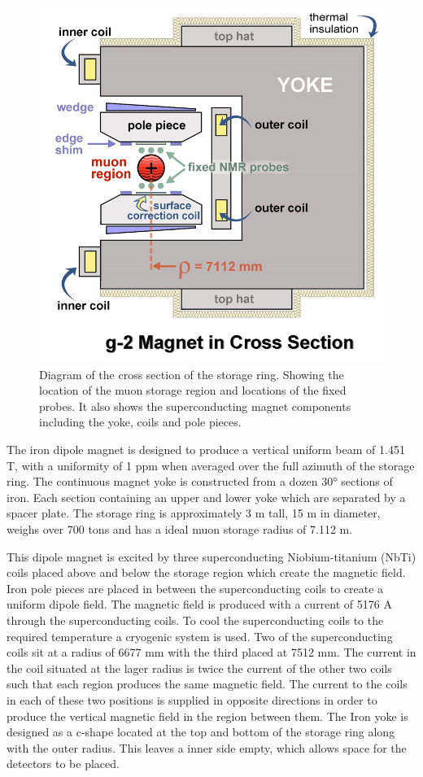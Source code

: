\begin{figure}[th]
\centering
\includegraphics[scale=0.8]{Figures/storageringmagnet}
\decoRule
\caption{Diagram of the cross section of the storage ring. 
Showing the location of the muon storage region and locations of the fixed probes. It also shows the superconducting magnet components including the yoke, coils and pole pieces.}
\label{fig:storageringmagnet}
\end{figure}

The iron dipole magnet is designed to produce a vertical uniform beam of 1.451 T, with a uniformity of 1 ppm when averaged over the full azimuth of the storage ring. The continuous magnet yoke is constructed from a dozen $\ang{30}$ sections of iron. Each section containing an upper and lower yoke which are separated by a spacer plate. The storage ring is approximately 3 m tall, 15 m in diameter, weighs over 700 tons and has a ideal muon storage radius of 7.112 m.  

This dipole magnet is excited by three superconducting Niobium-titanium (NbTi) coils placed above and below the storage region which create the magnetic field\cite{magref3}. Iron pole pieces are placed in between the superconducting coils to create a uniform dipole field. The magnetic field is produced with a current of 5176 A through the superconducting coils. To cool the superconducting coils to the required temperature a cryogenic system is used. Two of the superconducting coils sit at a radius of 6677 mm with the third placed at 7512 mm. The current in the coil situated at the lager radius is twice the current of the other two coils such that each region produces the same magnetic field. The current to the coils in each of these two positions is supplied in opposite directions in order to produce the vertical magnetic field in the region between them. The Iron yoke is designed as a c-shape located at the top and bottom of the storage ring along with the outer radius. This leaves a inner side empty, which allows space for the detectors to be placed.

